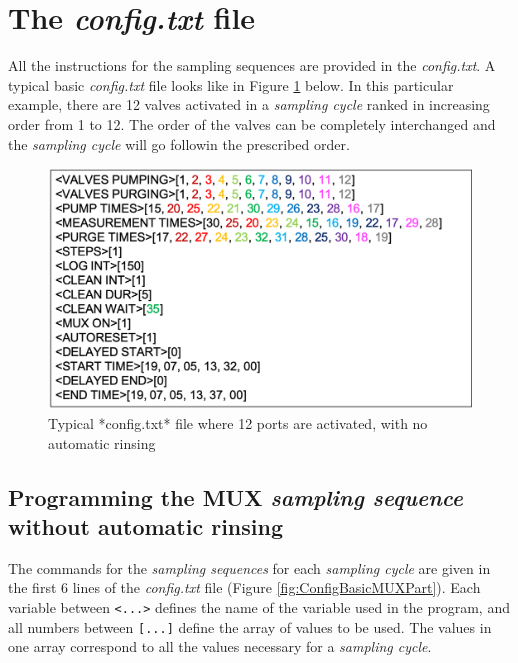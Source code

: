 \documentclass[]{book}
\begin{document}
\hypertarget{the-config.txt-file}{%
\section{\texorpdfstring{The \emph{config.txt} file}{The config.txt file}}\label{the-config.txt-file}}

All the instructions for the sampling sequences are provided in the \emph{config.txt}. A typical basic \emph{config.txt} file looks like in Figure \ref{fig:ConfigBasic} below. In this particular example, there are 12 valves activated in a \emph{sampling cycle} ranked in increasing order from 1 to 12. The order of the valves can be completely interchanged and the \emph{sampling cycle} will go followin the prescribed order.

\begin{figure}

\includegraphics[width=0.6\linewidth]{pictures/ConfigBasic} \hfill{}

\caption{Typical *config.txt* file where 12 ports are activated, with no automatic rinsing}\label{fig:ConfigBasic}
\end{figure}

\hypertarget{programming-the-mux-sampling-sequence-without-automatic-rinsing}{%
\subsection{\texorpdfstring{Programming the MUX \emph{sampling sequence} without automatic rinsing}{Programming the MUX sampling sequence without automatic rinsing}}\label{programming-the-mux-sampling-sequence-without-automatic-rinsing}}

The commands for the \emph{sampling sequences} for each \emph{sampling cycle} are given in the first 6 lines of the \emph{config.txt} file (Figure \ref{fig:ConfigBasicMUXPart}). Each variable between \texttt{\textless{}...\textgreater{}} defines the name of the variable used in the program, and all numbers between \texttt{{[}...{]}} define the array of values to be used. The values in one array correspond to all the values necessary for a \emph{sampling cycle}.
\end{document}
